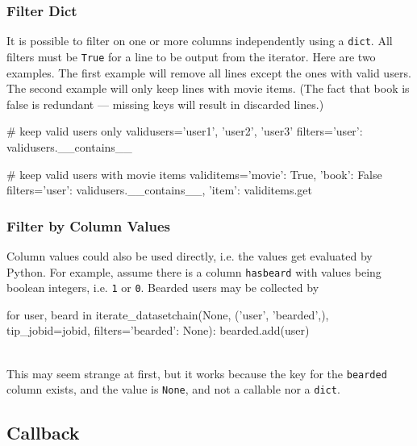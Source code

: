 \subsubsection*{Filter Dict}

It is possible to filter on one or more columns independently using a
\texttt{dict}.  All filters must be \texttt{True} for a line to be
output from the iterator.  Here are two examples.  The first example
will remove all lines except the ones with valid users.  The second
example will only keep lines with movie items.  (The fact that book is
false is redundant --- missing keys will result in discarded lines.)

\begin{python}
# keep valid users only
validusers={'user1', 'user2', 'user3'}
filters={'user': validusers.__contains__}

# keep valid users with movie items
validitems={'movie': True, 'book': False}
filters={'user': validusers.__contains__, 'item': validitems.get}
\end{python}




\subsubsection*{Filter by Column Values}


Column values could also be used directly, i.e. the values get
evaluated by Python.  For example, assume there is a column
\texttt{hasbeard} with values being boolean integers, i.e.  \texttt{1}
or \texttt{0}.  Bearded users may be collected by
\\
\begin{python}
for user, beard in iterate_datasetchain(None, ('user', 'bearded',), tip_jobid=jobid,
                                       filters={'bearded': None}):
    bearded.add(user)
\end{python}
\\
This may seem strange at first, but it works because the key
for the \texttt{bearded} column exists, and the value is
\texttt{None}, and not a callable nor a \texttt{dict}.





    


\subsection{Callback}
\label{sec:callback}

